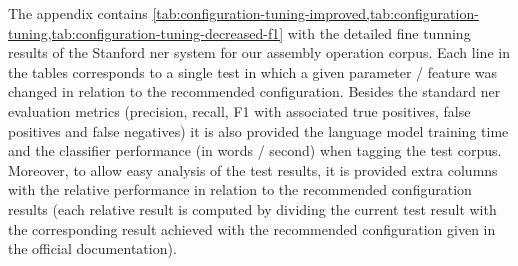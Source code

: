 \appendix\label{ap:tuning-tables}

The appendix contains \cref{tab:configuration-tuning-improved,tab:configuration-tuning,tab:configuration-tuning-decreased-f1} with the detailed fine tunning results of the Stanford \gls{ner} system for our assembly operation corpus. Each line in the tables corresponds to a single test in which a given parameter / feature was changed in relation to the recommended configuration. Besides the standard \gls{ner} evaluation metrics (precision, recall, F1 with associated true positives, false positives and false negatives) it is also provided the language model training time and the classifier performance (in words / second) when tagging the test corpus. Moreover, to allow easy analysis of the test results, it is provided extra columns with the relative performance in relation to the recommended configuration results (each relative result is computed by dividing the current test result with the corresponding result achieved with the recommended configuration given in the official documentation).

